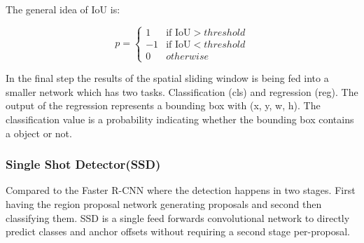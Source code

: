 The general idea of IoU is:
\vspace{0.25cm}
\begin{center}
    \begin{equation*}
        p =
        \begin{cases} 
            1 & \text{if IoU} > threshold \\
            -1 & \text{if IoU} < threshold \\
            0 & otherwise
        \end{cases}
    \end{equation*}
\end{center}
\vspace{0.25cm} \noindent
In the final step the results of the spatial sliding window is being fed into a smaller network which has two tasks. Classification (cls)
and regression (reg). The output of the regression represents a bounding box with (x, y, w, h). The classification value is a probability
indicating whether the bounding box contains a object or not.\cite{fasterrcnn}

\subsubsection{Single Shot Detector(SSD)}
Compared to the Faster R-CNN where the detection happens in two stages. First having the region proposal network generating proposals and
second then classifying them. SSD is a single feed forwards convolutional network to directly predict classes and anchor offsets
without requiring a second stage per-proposal.

     
